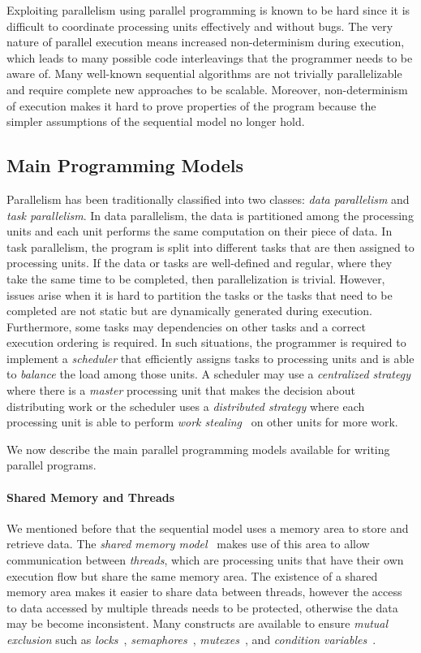 Exploiting parallelism using parallel programming is known to be hard since it
is difficult to coordinate processing units effectively and without bugs. The
very nature of parallel execution means increased non-determinism during
execution, which leads to many possible code interleavings that the programmer
needs to be aware of. Many well-known sequential algorithms are not trivially
parallelizable and require complete new approaches to be scalable. Moreover,
non-determinism of execution makes it hard to prove properties of the program
because the simpler assumptions of the sequential model no longer hold.

\subsection{Main Programming Models}

Parallelism has been traditionally classified into two classes: \emph{data
parallelism} and \emph{task parallelism}. In data parallelism, the data is
partitioned among the processing units and each unit performs the same
computation on their piece of data. In task parallelism, the program is split
into different tasks that are then assigned to processing units. If the data or
tasks are well-defined and regular, where they take the same time to be
completed, then parallelization is trivial. However, issues arise when it is
hard to partition the tasks or the tasks that need to be completed are not
static but are dynamically generated during execution. Furthermore, some tasks
may dependencies on other tasks and a correct execution ordering is required. In
such situations, the programmer is required to implement a \emph{scheduler} that
efficiently assigns tasks to processing units and is able to \emph{balance} the
load among those units. A scheduler may use a \emph{centralized strategy} where
there is a \emph{master} processing unit that makes the decision about
distributing work or the scheduler uses a \emph{distributed strategy} where each
processing unit is able to perform \emph{work stealing}~\cite{Blumofe:1999} on
other units for more work.

We now describe the main parallel programming models available for writing
parallel programs.

\paragraph{Shared Memory and Threads}

We mentioned before that the sequential model uses a memory area to store and
retrieve data. The \emph{shared memory model}~\cite{Mellor-Crummey:1991} makes
use of this area to allow communication between \emph{threads}, which are
processing units that have their own execution flow but share the same memory
area. The existence of a shared memory area makes it easier to share data
between threads, however the access to data accessed by multiple threads needs
to be protected, otherwise the data may be become inconsistent. Many constructs
are available to ensure \emph{mutual exclusion} such as
\emph{locks}~\cite{Silberschatz:2008}, \emph{semaphores}~\cite{Dijkstra:2002},
\emph{mutexes}~\cite{Silberschatz:2008}, and \emph{condition
variables}~\cite{Hoare:1974}.

